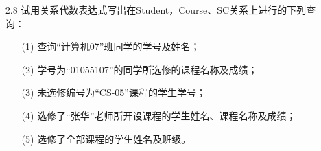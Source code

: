 \documentclass[UTF8]{ctexart}
\begin{document}
\begin{itemize}
	\item[2.8] 试用关系代数表达式写出在Student，Course、SC关系上进行的下列查询：
	\begin{enumerate}
		\item[(1)] 查询“计算机07”班同学的学号及姓名；
		\item[(2)] 学号为“01055107”的同学所选修的课程名称及成绩；
		\item[(3)] 未选修编号为“CS-05”课程的学生学号；
		\item[(4)] 选修了“张华”老师所开设课程的学生姓名、课程名称及成绩；
		\item[(5)] 选修了全部课程的学生姓名及班级。
	\end{enumerate}
\end{itemize}
\end{document}
